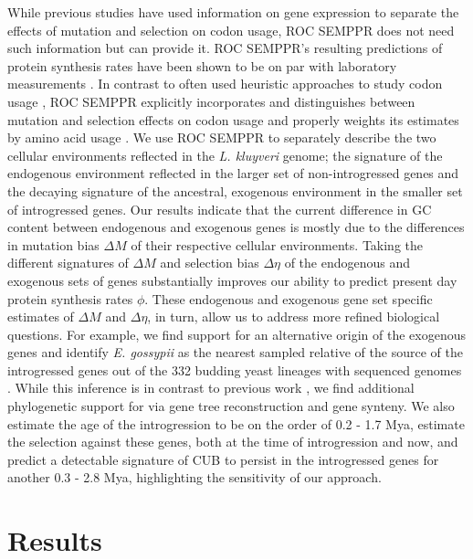 \documentclass[doublespacing,linenumbers]{bmcart-modified}
\newcommand{\kluyveri}{\textit{L. kluyveri}\xspace}
\newcommand{\gossypii}{\textit{E. gossypii}\xspace}
\newcommand{\ROC}{ROC SEMPPR\xspace}
\newcommand{\GC}{GC content\xspace}
\newcommand{\DM}{\ensuremath{{\Delta M}}\xspace}
\newcommand{\DE}{\ensuremath{{\Delta \eta}}\xspace}
\begin{document}
While previous studies \citep{ShahAndGilchrist2011, wallace2013} have used information on gene expression to separate the effects of mutation and selection on codon usage, \ROC does not need such information but can provide it.
\ROC's resulting predictions of protein synthesis rates have been shown to be on par with laboratory measurements \citep{ShahAndGilchrist2011, gilchrist2015}.
In contrast to often used heuristic approaches to study codon usage \citep{sharp1987, Wright1990, dosreis2004}, \ROC explicitly incorporates and distinguishes between mutation and selection effects on codon usage and properly weights its estimates by amino acid usage \citep{cope2018}. %
We use \ROC to separately describe the two cellular environments reflected in the \kluyveri genome; the signature of the endogenous environment reflected in the larger set of non-introgressed genes and the decaying signature of the ancestral, exogenous environment in the smaller set of introgressed genes.
Our results indicate that the current difference in \GC between endogenous and exogenous genes is mostly due to the differences in mutation bias \DM of their respective cellular environments.
Taking the different signatures of \DM and selection bias \DE of the endogenous and exogenous sets of genes substantially improves our ability to predict present day protein synthesis rates $\phi$.
These endogenous and exogenous gene set specific estimates of \DM and \DE, in turn, allow us to address more refined biological questions.
For example, we find support for an alternative origin of the exogenous genes and identify \gossypii as the nearest sampled relative of the source of the introgressed genes out of the 332 budding yeast lineages with sequenced genomes \citep{shen2018}.
While this inference is in contrast to previous work \citep{payen2009, friedrich2015, vakirlis2016, brion2017}, we find additional phylogenetic support for via gene tree reconstruction and gene synteny.
We also estimate the age of the introgression to be on the order of 0.2 - 1.7 Mya, estimate the selection against these genes, both at the time of introgression and now, and predict a detectable signature of CUB to persist in the introgressed genes for another 0.3 - 2.8 Mya, highlighting the sensitivity of our approach.

\section*{Results}
\end{document}
